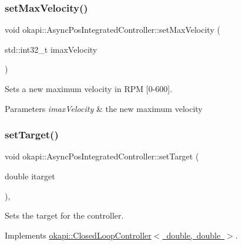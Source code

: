 \subsubsection{\texorpdfstring{setMaxVelocity()}{setMaxVelocity()}}
{\footnotesize\ttfamily void okapi\+::\+Async\+Pos\+Integrated\+Controller\+::set\+Max\+Velocity (\begin{DoxyParamCaption}\item[{std\+::int32\+\_\+t}]{imax\+Velocity }\end{DoxyParamCaption})\hspace{0.3cm}{\ttfamily [virtual]}}

Sets a new maximum velocity in R\+PM \mbox{[}0-\/600\mbox{]}.


\begin{DoxyParams}{Parameters}
{\em imax\+Velocity} & the new maximum velocity \\
\hline
\end{DoxyParams}
\mbox{\label{classokapi_1_1AsyncPosIntegratedController_ae5cb385dc40c2c183266a3fa4aed7cac}} 
\subsubsection{\texorpdfstring{setTarget()}{setTarget()}}
{\footnotesize\ttfamily void okapi\+::\+Async\+Pos\+Integrated\+Controller\+::set\+Target (\begin{DoxyParamCaption}\item[{double}]{itarget }\end{DoxyParamCaption})\hspace{0.3cm}{\ttfamily [override]}, {\ttfamily [virtual]}}

Sets the target for the controller. 

Implements \mbox{\hyperlink{classokapi_1_1ClosedLoopController_ac14482d0768b3f157d52e0214a4c36d7}{okapi\+::\+Closed\+Loop\+Controller$<$ double, double $>$}}.

\mbox{\label{classokapi_1_1AsyncPosIntegratedController_a22fdea35f8d56d81496dcf191f0c2852}} 
